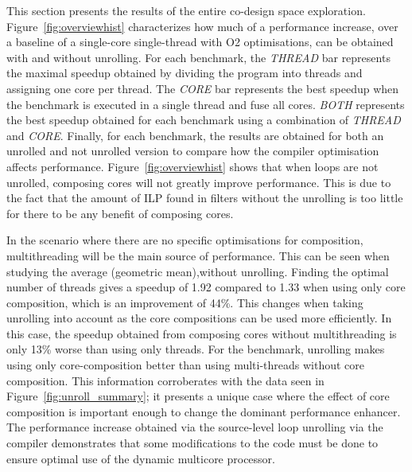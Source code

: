 This section  presents the results of the entire co-design space exploration.
Figure~\ref{fig:overviewhist} characterizes how much of a performance increase, over a baseline of a single-core single-thread with O2 optimisations, can be obtained with and without unrolling.
For each benchmark, the \textit{THREAD} bar represents the maximal speedup obtained by dividing the program into threads and assigning one core per thread.
The \textit{CORE} bar represents the best speedup when the benchmark is executed in a single thread and fuse all cores.
\textit{BOTH} represents the best speedup obtained for each benchmark using a combination of \textit{THREAD} and \textit{CORE}.
Finally, for each benchmark, the results are obtained for both an unrolled and not unrolled version to compare how the compiler optimisation affects performance.
Figure~\ref{fig:overviewhist} shows that when loops are not unrolled, composing cores will not greatly improve performance.
This is due to the fact that the amount of ILP found in filters without the unrolling is too little for there to be any benefit of composing cores.

In the scenario where there are no specific optimisations for composition, multithreading will be the main source of performance.
This can be seen when studying the average (geometric mean),without unrolling.
Finding the optimal number of threads gives a speedup of 1.92 compared to 1.33 when using only core composition, which is an improvement of 44\%.
This changes when taking unrolling into account as the core compositions can be used more efficiently.
In this case, the speedup obtained from composing cores without multithreading is only 13\% worse than using only threads.
For the  benchmark, unrolling makes using only core-composition better than using multi-threads without core composition.
This information corroberates with the data seen in Figure~\ref{fig:unroll_summary}; it presents a unique case where the effect of core composition is important enough to change the dominant performance enhancer.
The performance increase obtained via the source-level loop unrolling via the compiler demonstrates that some modifications to the code must be done to ensure optimal use of the dynamic multicore processor.

